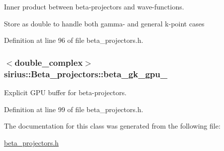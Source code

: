 Inner product between beta-\/projectors and wave-\/functions. 

Store as double to handle both gamma-\/ and general k-\/point cases 

Definition at line 96 of file beta\+\_\+projectors.\+h.

\hypertarget{classsirius_1_1_beta__projectors_aaf7e217e59a9d8388d6b9921a9264775}{}
\subsubsection[{beta\+\_\+gk\+\_\+gpu\+\_\+}]{$<$double\+\_\+complex$>$ sirius\+::\+Beta\+\_\+projectors\+::beta\+\_\+gk\+\_\+gpu\+\_\+\hspace{0.3cm}{\ttfamily [protected]}}\label{classsirius_1_1_beta__projectors_aaf7e217e59a9d8388d6b9921a9264775}


Explicit G\+P\+U buffer for beta-\/projectors. 



Definition at line 99 of file beta\+\_\+projectors.\+h.



The documentation for this class was generated from the following file\+:\begin{DoxyCompactItemize}
\item 
\hyperlink{beta__projectors_8h}{beta\+\_\+projectors.\+h}\end{DoxyCompactItemize}
